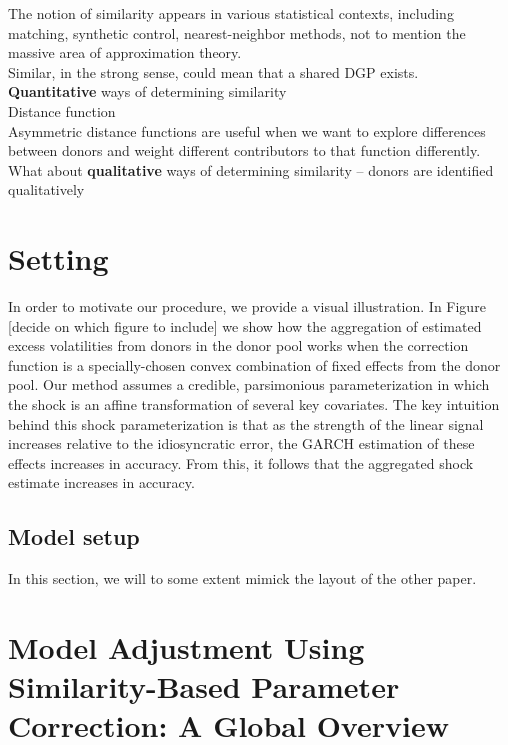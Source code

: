 \documentclass[11pt]{article}
\theoremstyle{definition}
\begin{document}
The notion of similarity appears in various statistical contexts, including matching, synthetic control, nearest-neighbor methods, not to mention the massive area of approximation theory.\\

Similar, in the strong sense, could mean that a shared DGP exists.\\

\textbf{Quantitative} ways of determining similarity\\

Distance function\\

Asymmetric distance functions are useful when we want to explore differences between donors and weight different contributors to that function differently.\\

What about \textbf{qualitative} ways of determining similarity -- \cite{lundquist2024volatility} donors are identified qualitatively

\section{Setting}\label{Section}


In order to motivate our procedure, we provide a visual illustration.  In Figure [decide on which figure to include] %
we show how the aggregation of estimated excess volatilities from donors in the donor pool works when the correction function is a specially-chosen convex combination of fixed effects from the donor pool.  Our method assumes a credible, parsimonious parameterization in which the shock is an affine transformation of several key covariates.  The key intuition behind this shock parameterization is that as the strength of the linear signal increases relative to the idiosyncratic error, the GARCH estimation of these effects increases in accuracy.  From this, it follows that the aggregated shock estimate increases in accuracy.


\subsection{Model setup}
\label{modelsetup}

In this section, we will to some extent mimick the layout of the other paper.

\section{Model Adjustment Using Similarity-Based Parameter Correction: A Global Overview}
\end{document}
